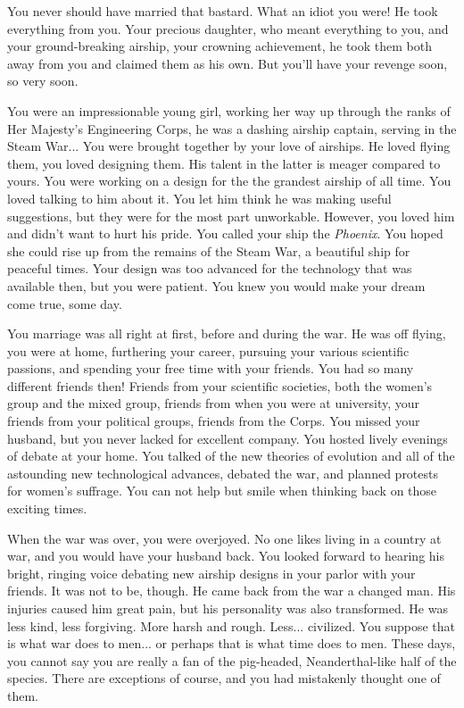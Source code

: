 \documentclass[char]{airship}
\begin{document}

\name{\cCurie{}}

You never should have married that bastard. What an idiot you were! He
took everything from you. Your precious daughter, who meant everything
to you, and your ground-breaking airship, your crowning achievement, he
took them both away from you and claimed them as his own.  But you'll
have your revenge soon, so very soon.

You were an impressionable young girl, working her way up through the
ranks of Her Majesty's Engineering Corps, he was a dashing airship
captain, serving in the Steam War... You were brought together by your
love of airships. He loved flying them, you loved designing them. His
talent in the latter is meager compared to yours. You were working on
a design for the the grandest airship of all time. You loved talking
to him about it. You let him think he was making useful suggestions,
but they were for the most part unworkable. However, you loved him and
didn't want to hurt his pride. You called your ship the {\em
Phoenix}. You hoped she could rise up from the remains of the Steam
War, a beautiful ship for peaceful times. Your design was too advanced
for the technology that was available then, but you were patient. You
knew you would make your dream come true, some day.

You marriage was all right at first, before and during the war. He was
off flying, you were at home, furthering your career, pursuing your
various scientific passions, and spending your free time with your
friends. You had so many different friends then! Friends from your
scientific societies, both the women's group and the mixed group,
friends from when you were at university, your friends from your
political groups, friends from the Corps. You missed your husband, but
you never lacked for excellent company. You hosted lively evenings of
debate at your home. You talked of the new theories of evolution and
all of the astounding new technological advances, debated the war, and
planned protests for women's suffrage. You can not help but smile when
thinking back on those exciting times.

When the war was over, you were overjoyed. No one likes living in a
country at war, and you would have your husband back. You looked
forward to hearing his bright, ringing voice debating new airship
designs in your parlor with your friends. It was not to be, though. He
came back from the war a changed man. His injuries caused him great
pain, but his personality was also transformed. He was less kind, less
forgiving. More harsh and rough. Less... civilized. You suppose that
is what war does to men... or perhaps that is what time does to
men. These days, you cannot say you are really a fan of the
pig-headed, Neanderthal-like half of the species. There are exceptions
of course, and you had mistakenly thought \cCaptain{} one of them.
\end{document}
